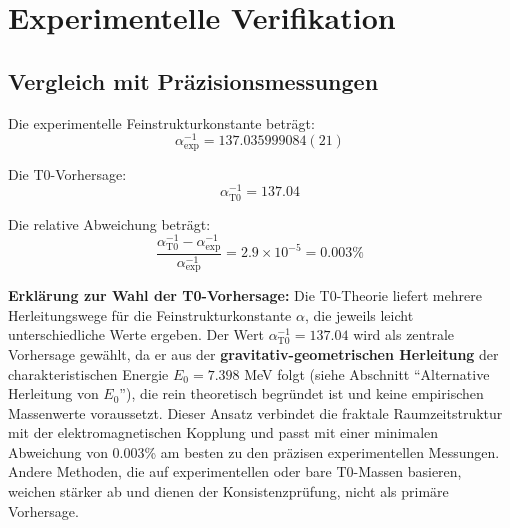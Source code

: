 \documentclass[12pt,a4paper]{article}
\newcommand{\Ezero}{E_0}
\begin{document}
	\section{Experimentelle Verifikation}
	
	\subsection{Vergleich mit Präzisionsmessungen}
	
	Die experimentelle Feinstrukturkonstante beträgt:
	\begin{equation}
		\alpha_{\text{exp}}^{-1} = 137.035999084(21)
	\end{equation}
	
	Die T0-Vorhersage:
	\begin{equation}
		\alpha_{\text{T0}}^{-1} = 137.04
		\label{eq:alpha_t0}
	\end{equation}
	
	Die relative Abweichung beträgt:
	\begin{equation}
		\frac{\alpha_{\text{T0}}^{-1} - \alpha_{\text{exp}}^{-1}}{\alpha_{\text{exp}}^{-1}} = 2.9 \times 10^{-5} = 0.003\%
	\end{equation}
	
	\textbf{Erklärung zur Wahl der T0-Vorhersage:} Die T0-Theorie liefert mehrere Herleitungswege für die Feinstrukturkonstante $\alpha$, die jeweils leicht unterschiedliche Werte ergeben. Der Wert $\alpha_{\text{T0}}^{-1} = 137.04$ wird als zentrale Vorhersage gewählt, da er aus der \textbf{gravitativ-geometrischen Herleitung} der charakteristischen Energie $\Ezero = 7.398$ MeV folgt (siehe Abschnitt ``Alternative Herleitung von $\Ezero$''), die rein theoretisch begründet ist und keine empirischen Massenwerte voraussetzt. Dieser Ansatz verbindet die fraktale Raumzeitstruktur mit der elektromagnetischen Kopplung und passt mit einer minimalen Abweichung von 0.003\% am besten zu den präzisen experimentellen Messungen. Andere Methoden, die auf experimentellen oder bare T0-Massen basieren, weichen stärker ab und dienen der Konsistenzprüfung, nicht als primäre Vorhersage.
	
\end{document}
